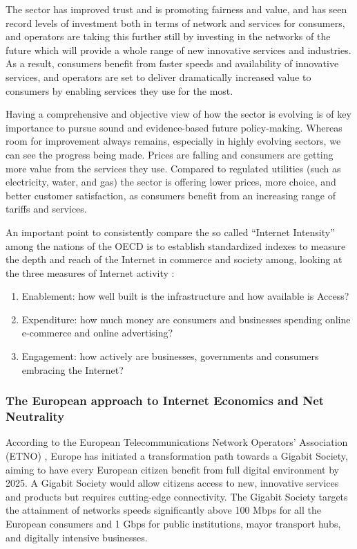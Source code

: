 \documentclass[journal]{IEEEtran}
\begin{document}
The sector has improved trust and is promoting fairness and value, and has seen record levels of investment both in terms of network and services for consumers, and operators are taking this further still by investing in the networks of the future which will provide a whole range of new innovative services and industries. As a result, consumers benefit from faster speeds and availability of innovative services, and operators are set to deliver dramatically increased value to consumers by enabling services they use for the most.

Having a comprehensive and objective view of how the sector is evolving is of key importance to pursue sound and evidence-based future policy-making. Whereas room for improvement always remains, especially in highly evolving sectors, we can see the progress being made. Prices are falling and consumers are getting more value from the services they use. Compared to regulated utilities (such as electricity, water, and gas) the sector is offering lower prices, more choice, and better customer satisfaction, as consumers benefit from an increasing range of tariffs and services.\cite{ETNO_DCV}

An important point to consistently compare the so called \enquote{Internet Intensity} among the nations of the OECD is to establish standardized indexes to measure the depth and reach of the Internet in commerce and society among, looking at the three measures of Internet activity \cite{BCG_CK}:
\begin{enumerate}
    \item Enablement: how well built is the infrastructure and how available is Access?
    \item Expenditure: how much money are consumers and businesses spending online e-commerce and online advertising?
    \item Engagement: how actively are businesses, governments and consumers embracing the Internet?
\end{enumerate}

\subsubsection{The European approach to Internet Economics and Net Neutrality}
According to the European Telecommunications Network Operators' Association (ETNO) \cite{ETNO_DCV}, Europe has initiated a transformation path towards a Gigabit Society, aiming to have every European citizen benefit from full digital environment by 2025. A Gigabit Society would allow citizens access to new, innovative services and products but requires cutting-edge connectivity. The Gigabit Society targets the attainment of networks speeds significantly above 100 Mbps for all the European consumers and 1 Gbps for public institutions, mayor transport hubs, and digitally intensive businesses.
\end{document}

